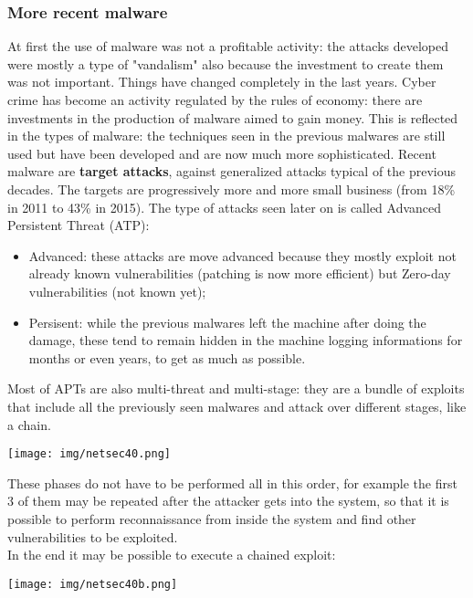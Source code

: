 \documentclass[a4paper, 10pt, titlepage]{article}
\begin{document}
\subsubsection*{More recent malware}
At first the use of malware was not a profitable activity: the attacks developed were mostly a type of "vandalism" also because the investment to create them was not important. Things have changed completely in the last years. Cyber crime has become an activity regulated by the rules of economy: there are investments in the production of malware aimed to gain money. This is reflected in the types of malware: the techniques seen in the previous malwares are still used but have been developed and are now much more sophisticated. Recent malware are \textbf{target attacks}, against generalized attacks typical of the previous decades.
The targets are progressively more and more small business (from 18\% in 2011 to 43\% in 2015). The type of attacks seen later on is called Advanced Persistent Threat (ATP):
\begin{itemize}
	\item Advanced: these attacks are move advanced because they mostly exploit not already known vulnerabilities (patching is now more efficient) but Zero-day vulnerabilities (not known yet);
	\item Persisent: while the previous malwares left the machine after doing the damage, these tend to remain hidden in the machine logging informations for months or even years, to get as much as possible. 
\end{itemize}
Most of APTs are also multi-threat and multi-stage: they are a bundle of exploits that include all the previously seen malwares and attack over different stages, like a chain.
\begin{center}
	\texttt{[image: img/netsec40.png]}
\end{center}
These phases do not have to be performed all in this order, for example the first 3 of them may be repeated after the attacker gets into the system, so that it is possible to perform reconnaissance from inside the system and find other vulnerabilities to be exploited. \\
In the end it may be possible to execute a chained exploit:
\begin{center}
	\texttt{[image: img/netsec40b.png]}
\end{center}
\end{document}
